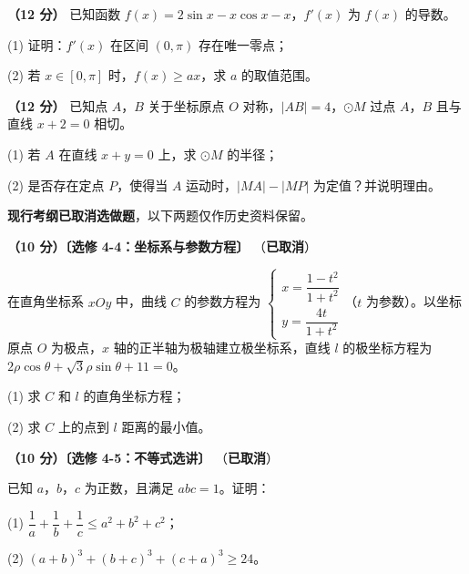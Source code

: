 \begin{question}
\textbf{（12 分）} 已知函数 $f(x)=2\sin x-x\cos x-x$，$f'(x)$ 为 $f(x)$ 的导数。

  (1) 证明：$f'(x)$ 在区间 $(0,\pi)$ 存在唯一零点；

  (2) 若 $x\in[0,\pi]$ 时，$f(x)\ge ax$，求 $a$ 的取值范围。

\end{question}
\begin{question}
\textbf{（12 分）} 已知点 $A$，$B$ 关于坐标原点 $O$ 对称，$|AB|=4$，$\odot M$ 过点 $A$，$B$ 且与直线 $x+2=0$ 相切。

  (1) 若 $A$ 在直线 $x+y=0$ 上，求 $\odot M$ 的半径；

  (2) 是否存在定点 $P$，使得当 $A$ 运动时，$|MA|-|MP|$ 为定值？并说明理由。

\par\medskip

\end{question}

\begin{gktip}
\textbf{ 现行考纲已取消选做题}，以下两题仅作历史资料保留。
\end{gktip}

\begin{question}
\textbf{（10 分）〔选修 4-4：坐标系与参数方程〕} （\textbf{已取消}）

在直角坐标系 $xOy$ 中，曲线 $C$ 的参数方程为 $\begin{cases}x=\dfrac{1-t^{2}}{1+t^{2}}\\[2mm] y=\dfrac{4t}{1+t^{2}}\end{cases}$（$t$ 为参数）。以坐标原点 $O$ 为极点，$x$ 轴的正半轴为极轴建立极坐标系，直线 $l$ 的极坐标方程为 $2\rho\cos\theta+\sqrt3\rho\sin\theta+11=0$。

  (1) 求 $C$ 和 $l$ 的直角坐标方程；

  (2) 求 $C$ 上的点到 $l$ 距离的最小值。

\end{question}
\begin{question}
\textbf{（10 分）〔选修 4-5：不等式选讲〕} （\textbf{已取消}）

已知 $a$，$b$，$c$ 为正数，且满足 $abc=1$。证明：

  (1) $\dfrac1a+\dfrac1b+\dfrac1c\le a^{2}+b^{2}+c^{2}$；

  (2) $(a+b)^{3}+(b+c)^{3}+(c+a)^{3}\ge24$。

\par\medskip


\end{question}